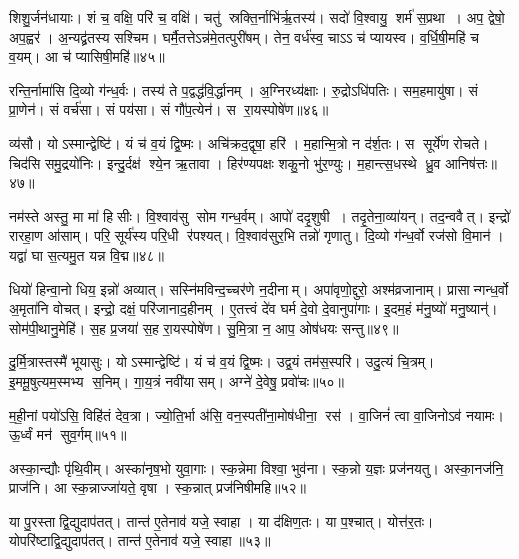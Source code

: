 शिशु॒र्जन॑धायाः। 
शं च॒ वक्षि॒ परि॑ च॒ वक्षि॑। 
चतु॑ स्रक्ति॒र्नाभि॑र्\mbox{}ऋ॒तस्य॑। 
सदो॑ वि॒श्वायु॒ शर्म॑ स॒प्रथा। 
अप॒ द्वेषो॒ अप॒ह्वर॑। 
अ॒न्यद्व्र॑तस्य सश्चिम। 
घर्मै॒तत्तेऽन्न॑मे॒तत्पुरी॑षम्। 
तेन॒ वर्ध॑स्व॒ चाऽऽ च॑ प्यायस्व। 
व॒र्धि॒षी॒महि॑ च व॒यम्। 
आ च॑ प्यासिषी॒महि॑॥४५॥

रन्ति॒र्नामा॑सि दि॒व्यो ग॑न्ध॒र्वः। 
तस्य॑ ते प॒द्वद्ध॑वि॒र्द्धानम्। 
अ॒ग्निरध्य॑क्षाः। 
रु॒द्रोऽधि॑पतिः। 
सम॒हमायु॑षा। 
सं प्रा॒णेन॑। 
सं वर्च॑सा। 
सं पय॑सा। 
सं गौ॑प॒त्येन॑। 
स रा॒यस्पोषे॑ण॥४६॥

व्य॑सौ। 
योऽस्मान्द्वेष्टि॑। 
यं च॑ व॒यं द्वि॒ष्मः। 
अचि॑क्रद॒द्वृषा॒ हरि॑। 
म॒हान्मि॒त्रो न द॑र्\mbox{}श॒तः। 
स सूर्ये॑ण रोचते। 
चिद॑सि समु॒द्रयो॑निः। 
इन्दु॒र्दक्ष॑ श्ये॒न ऋ॒तावा। 
हिर॑ण्यपक्षः  शकु॒नो भु॑र॒ण्युः। 
म॒हान्त्स॒धस्थे ध्रु॒व आनिष॑त्तः॥४७॥

नम॑स्ते अस्तु॒ मा मा॑ हिसीः। 
वि॒श्वाव॑सु सोम गन्ध॒र्वम्। 
आपो॑ ददृ॒शुषी। 
तदृ॒तेना॒व्या॑यन्। 
तद॒न्ववैत्। 
इन्द्रो॑ रारहा॒ण आ॑साम्। 
परि॒ सूर्य॑स्य परि॒धी र॑पश्यत्। 
वि॒श्वाव॑सुर॒भि तन्नो॑ गृणातु। 
दि॒व्यो ग॑न्ध॒र्वो रज॑सो वि॒मान॑। 
यद्वा॑ घा स॒त्यमु॒त यन्न वि॒द्म॥४८॥

धियो॑ हिन्वा॒नो धिय॒ इन्नो॑ अव्यात्। 
सस्नि॑मविन्द॒च्चर॑णे न॒दीनाम्। 
अपा॑वृणो॒द्दुरो॒ अश्म॑व्रजानाम्। 
प्रासान्गन्ध॒र्वो अ॒मृता॑नि वोचत्। 
इन्द्रो॒ दक्षं॒ परि॑जानाद॒हीनम्। 
ए॒तत्त्वं दे॑व घर्म दे॒वो दे॒वानुपा॑गाः। 
इ॒दम॒हं म॑नु॒ष्यो॑ मनु॒ष्यान्॑। 
सोम॑पी॒थानु॒मेहि॑। 
स॒ह प्र॒जया॑ स॒ह रा॒यस्पोषे॑ण। 
सु॒मि॒त्रा न॒ आप॒ ओष॑धयः सन्तु॥४९॥

दु॒र्मि॒त्रास्तस्मै॑ भूयासुः। 
योऽस्मान्द्वेष्टि॑। 
यं च॑ व॒यं द्वि॒ष्मः। 
उद्व॒यं तम॑स॒स्परि॑। 
उदु॒त्यं चि॒त्रम्। 
इ॒ममू॒षुत्यम॒स्मभ्य स॒निम्। 
गा॒य॒त्रं नवी॑यासम्। 
अग्ने॑ दे॒वेषु॒ प्रवो॑चः॥५०॥
\anuvakamend[याऽऽग्नीध्रे॒ तान्त॑ ए॒तेनाव॑ यजे॒ स्वाहा॒ धर्म॑णा शं॒ युधा॑याः प्यासिषी॒महि॒ पोषे॑ण॒ निष॑त्तो वि॒द्म स॑न्त्व॒ष्टौ]

म॒ही॒नां पयो॑ऽसि॒ विहि॑तं देव॒त्रा। 
ज्यो॒ति॒र्भा अ॑सि॒ वन॒स्पती॑ना॒\-मोष॑धीना॒ रस॑। 
वा॒जिनं॑ त्वा वा॒जिनोऽव॑ नयामः। 
ऊ॒र्ध्वं मन॑ सुव॒र्गम्॥५१॥
\anuvakamend

अस्का॒न्द्यौः पृ॑थि॒वीम्। 
अस्का॑नृष॒भो युवा॒गाः। 
स्क॒न्नेमा विश्वा॒ भुव॑ना। 
स्क॒न्नो य॒ज्ञः प्रज॑नयतु। 
अस्का॒नज॑नि॒ प्राज॑नि। 
आ स्क॒न्नाज्जा॑यते॒ वृषा। 
स्क॒न्नात् प्रज॑निषीमहि॥५२॥
\anuvakamend

या पु॒रस्ताद्वि॒द्युदाप॑तत्। 
तान्त॑ ए॒तेनाव॑ यजे॒ स्वाहा। 
या द॑क्षिण॒तः। 
या प॒श्चात्। 
योत्त॑र॒तः। 
योपरि॑ष्टाद्वि॒द्युदाप॑तत्। 
तान्त॑ ए॒तेनाव॑ यजे॒ स्वाहा॥५३॥
\anuvakamend

